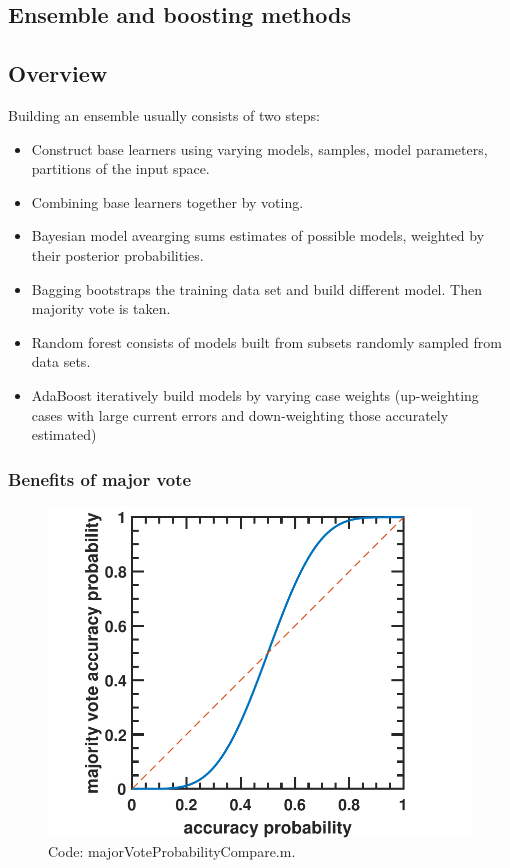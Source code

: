 \begin{refsection}
	\startcontents[chapters]	


\chapter{Ensemble and boosting methods}

\section{Overview}



Building an ensemble usually consists of two steps:
\begin{itemize}
	\item Construct base learners using varying models, samples, model parameters, partitions of the input space.
	\item Combining base learners together by voting.
\end{itemize}


\begin{remark}\cite[5]{seni2010ensemble}
	
\end{remark}
\begin{itemize}
	\item Bayesian model avearging sums estimates of possible models, weighted by their posterior probabilities.
	\item Bagging bootstraps the training data set and build different model. Then majority vote is taken.
	\item Random forest consists of models built from subsets randomly sampled from data sets. 
	\item AdaBoost iteratively build models by varying case weights (up-weighting cases with large current errors and down-weighting those accurately estimated) 
\end{itemize}


\subsection{Benefits of major vote}

\begin{figure}
\centering
\includegraphics[width=0.6\linewidth]{../figures/statisticalLearning/ensembleMethods/majorVoteAccuracyProbabilityVsSingleVote}
\caption{Code: majorVoteProbabilityCompare.m. }
\label{fig:majorVoteAccuracyProbabilityVsSingleVote}
\end{figure}


\end{refsection}
